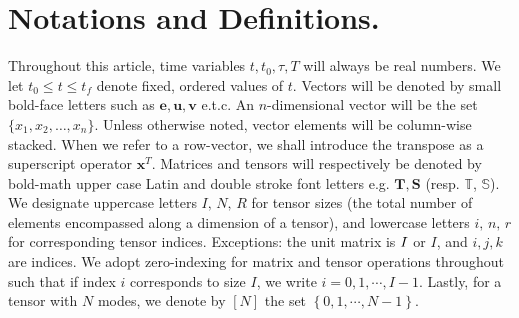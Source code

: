 \section{Notations and Definitions.}
\label{sec:notations}

\noindent Throughout this article, time variables \eg $t, t_0, \tau, T$ will always be  real numbers. We let $t_0 \le t \le t_f$ denote fixed, ordered values of $t$. Vectors will be denoted by small bold-face letters such as $\mathbf{e}, \mathbf{u}, \mathbf{v}$  e.t.c. An $n$-dimensional vector will be the set $\{x_1, x_2, \ldots, x_n\}$. Unless otherwise noted, vector elements will be column-wise stacked. When we refer to a row-vector, we shall introduce the transpose as a superscript operator \ie  $\bm{x}^T$. Matrices and tensors will respectively be denoted by bold-math upper case  Latin and double stroke font letters  e.g. $\mathbf{T}, \mathbf{S}$ (resp. $\mathbf{\mathds{T}}$, $\mathbf{\mathds{S}}$).  We designate uppercase letters $I, \, N, \, R$ for tensor sizes (the total number of elements encompassed along a dimension of a tensor), and lowercase letters $i, \, n,  \, r$ for corresponding tensor indices. Exceptions: the unit matrix is $I$ or $I$, and $i,j,k$ are indices.  We adopt zero-indexing for matrix and tensor operations throughout such that if index $i$ corresponds to size $I$, we write $i = 0, 1, \cdots , I-1$. Lastly, for a tensor with $N$ modes, we denote by $\left[N\right]$ the set $\left\{0,1,\cdots,N-1\right\}$.

%
%
%
%
